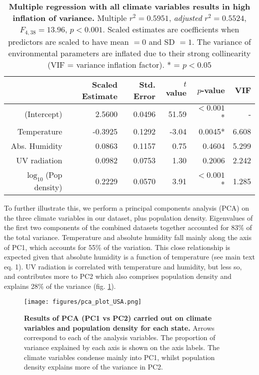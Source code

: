 \documentclass[12pt,english,a4paper]{article}
\begin{document}
\begin{table}[ht]
\centering
\caption{\textbf{Multiple regression with all climate variables results in high inflation of variance.} Multiple $r^2 = 0.5951$, \textsl{adjusted} $r^2 = 0.5524$, $F_{4,38} = 13.96$, $p < 0.001$. Scaled estimates are coefficients when predictors are scaled to have mean $= 0$ and SD $= 1$. The variance of environmental parameters are inflated due to their strong collinearity (VIF = variance inflation factor). * = $p < 0.05$}
\begin{tabular}{rrrrrr}
  \hline
 & Scaled Estimate & Std. Error &  $t$ value & $p$-value & VIF \\ 
  \hline
  (Intercept) & 2.5600 & 0.0496 & 51.59 & $<0.001$* & - \\ 
  Temperature & -0.3925 & 0.1292 & -3.04 & 0.0045* & 6.608 \\ 
  Abs. Humidity & 0.0863 & 0.1157 & 0.75 & 0.4604 & 5.299 \\ 
  UV radiation & 0.0982 & 0.0753 & 1.30 & 0.2006 & 2.242 \\ 
  $\log_{10}$(Pop density) & 0.2229 & 0.0570 & 3.91 & $<0.001$* & 1.285  \\ 
   \hline
\end{tabular}
\label{tab:full_regression}
\end{table}

To further illustrate this, we perform a principal components analysis (PCA) on the three climate variables in our dataset, plus population density. Eigenvalues of the first two components of the combined datasets together accounted for 83\% of the total variance. Temperature and absolute humidity fall mainly along the axis of PC1, which accounts for 55\% of the variation. This close relationship is expected given that absolute humidity is a function of temperature (see main text eq. 1). UV radiation is correlated with temperature and humidity, but less so, and contributes more to PC2 which also comprises population density and explains 28\% of the variance (fig. \ref{fig:pca}).

\begin{figure}[ht]
  \centering
  \texttt{[image: figures/pca\_plot\_USA.png]}  
  \caption{ {\bf Results of PCA (PC1 vs PC2) carried out on climate variables and population density for each state.} Arrows correspond to each of the analysis variables. The proportion of variance explained by each axis is shown on the axis labels. The climate variables condense mainly into PC1, whilst population density explains more of the variance in PC2.}
\label{fig:pca}
\end{figure}
\end{document}
